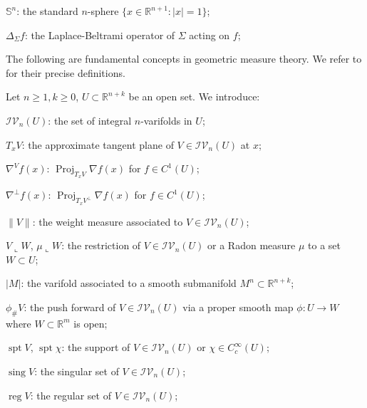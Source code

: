 \documentclass[11pt]{amsart}
\theoremstyle{definition}
\newcommand{\R}{\mathbb{R}}
\newcommand{\SSS}{\mathbb{S}}
\newcommand{\IV}{\mathcal{IV}}
\DeclareMathOperator{\spt}{spt}
\DeclareMathOperator{\sing}{sing}
\DeclareMathOperator{\proj}{Proj}
\DeclareMathOperator{\reg}{reg}
\DeclareMathOperator{\graph}{graph}
\begin{document}
$\SSS^n$: the standard $n$-sphere $\{x\in \R^{n+1}:|x|=1\}$;



$\Delta_\Sigma f$: the Laplace-Beltrami operator of $\Sigma$ acting on $f$;




The following are fundamental concepts in geometric measure theory. We refer to \cite{Fed,morgan2016gmt,Sim} for their precise definitions.

Let $n\ge 1,k\ge 0$, $U\subset\R^{n+k}$ be an open set. We introduce:

$\IV_n(U)$: the set of integral $n$-varifolds in $U$;


$T_xV$: the approximate tangent plane of $V\in \IV_n(U)$ at $x$;


$\nabla^V f(x)$: $\proj_{T_xV}\nabla f(x)$ for $f\in C^1(U)$;

$\nabla^\perp f(x)$: $\proj_{T_xV^\perp}\nabla f(x)$ for $f\in C^1(U)$;


$\|V\|$: the weight measure associated to $V\in \IV_n(U)$;

$V\llcorner W$, $\mu\llcorner W$: the restriction of $V\in \IV_n(U)$ or a Radon measure $\mu$ to a set $W\subset U$;

$|M|$: the varifold associated to a smooth submanifold $M^n\subset \R^{n+k}$;

$\phi_\#V$: the push forward of $V\in \IV_n(U)$ via a proper smooth map $\phi:U\to W$ where $W\subset \R^m$ is open;

$\spt V$, $\spt \chi$: the support of $V\in \IV_n(U)$ or $\chi\in C_c^\infty(U)$;

$\sing V$: the singular set of $V\in \IV_n(U)$;

$\reg V$: the regular set of $V\in \IV_n(U)$;
\end{document}
